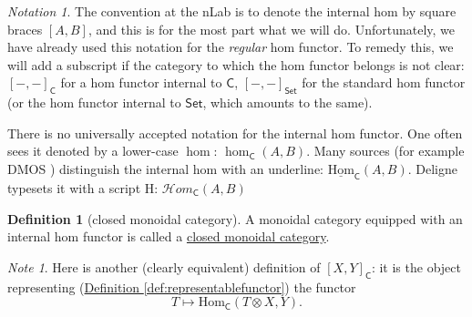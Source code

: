 \documentclass[a4paper]{report}
\newcommand{\defn}[1]{\ul{#1}}
\newcommand{\Hom}{\mathrm{Hom}}
\theoremstyle{definition}
\newtheorem{definition}{Definition}[section]
\theoremstyle{plain}
\theoremstyle{remark}
\newtheorem{note}{Note}[section]
\newtheorem{notation}{Notation}[section]
\begin{document}
\begin{notation}
  The convention at the nLab is to denote the internal hom by square braces $[A,B]$, and this is for the most part what we will do. Unfortunately, we have already used this notation for the \emph{regular} hom functor. To remedy this, we will add a subscript if the category to which the hom functor belongs is not clear: $[-,-]_{\mathsf{C}}$ for a hom functor internal to $\mathsf{C}$, $[-,-]_{\mathsf{Set}}$ for the standard hom functor (or the hom functor internal to $\mathsf{Set}$, which amounts to the same). 

  There is no universally accepted notation for the internal hom functor. One often sees it denoted by a lower-case $\hom$: $\hom_{\mathsf{C}}(A, B)$. Many sources (for example DMOS \cite{DMOS}) distinguish the internal hom with an underline: $\underline{\Hom}_{\mathsf{C}}(A, B)$. Deligne typesets it with a script H: $\mathscr{H}om_{\mathsf{C}}(A, B)$
\end{notation}

\begin{definition}[closed monoidal category]
  \label{def:closedmonoidalcategory}
  A monoidal category equipped with an internal hom functor is called a \defn{closed monoidal category}.
\end{definition}

\begin{note}
  Here is another (clearly equivalent) definition of $[X, Y]_{\mathsf{C}}$: it is the object representing (\hyperref[def:representablefunctor]{Definition \ref*{def:representablefunctor}}) the functor
  \begin{equation*}
    T \mapsto \Hom_\mathsf{C}(T \otimes X, Y).
  \end{equation*}
\end{note}
\end{document}
